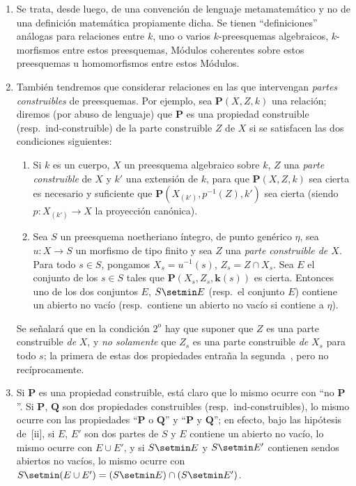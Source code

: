 \begin{remarks}[9.2.2]
\label{IV.9.2.2}
\begin{enumerate}[label=(\roman*)]
  \item Se trata, desde luego, de una convención de lenguaje metamatemático y no de una definición matemática propiamente dicha.
Se tienen ``definiciones'' análogas para relaciones entre $k$, uno o varios $k$-preesquemas algebraicos, $k$-morfismos entre estos preesquemas, Módulos coherentes sobre estos preesquemas u homomorfismos entre estos Módulos.
  \item También tendremos que considerar relaciones en las que intervengan \emph{partes construibles} de preesquemas.
Por ejemplo, sea $\boldsymbol{P}(X,Z,k)$ una relación; diremos (por abuso de lenguaje) que $\boldsymbol{P}$ es una propiedad construible (resp.\ ind-construible) de la parte construible $Z$ de $X$ si se satisfacen las dos condiciones siguientes:
\begin{enumerate}[label=$\arabic*^{\mathrm o}$]
  \item Si $k$ es un cuerpo, $X$ un preesquema algebraico sobre $k$, $Z$ una \emph{parte construible} de $X$ y $k'$ una extensión de $k$, para que $\boldsymbol{P}(X,Z,k)$ sea cierta es necesario y suficiente que $\boldsymbol{P}(X_{(k')},p^{-1}(Z),k')$ sea cierta (siendo $p:X_{(k')}\to X$ la proyección canónica).
  \item Sea $S$ un preesquema noetheriano íntegro, de punto genérico $\eta$, sea $u:X\to S$ un morfismo de tipo finito y sea $Z$ una \emph{parte construible de $X$}.
Para todo $s\in S$, pongamos $X_s=u^{-1}(s)$, $Z_s=Z\cap X_s$.
Sea $E$ el conjunto de los $s\in S$ tales que $\boldsymbol{P}(X_s,Z_s,\boldsymbol{k}(s))$ es cierta.
Entonces uno de los dos conjuntos $E$, $S\setmin E$ (resp.\ el conjunto $E$) contiene un abierto no vacío (resp.\ contiene un abierto no vacío si contiene a $\eta$).
\end{enumerate}

Se señalará que en la condición $2^{\mathrm o}$ hay que suponer que $Z$ es una parte construible \emph{de} $X$, y \emph{no solamente} que $Z_s$ es una parte construible \emph{de} $X_s$ para todo $s$; la primera de estas dos propiedades entraña la segunda~, pero no recíprocamente.

  \item Si $\boldsymbol{P}$ es una propiedad construible, está claro que lo mismo ocurre con ``no $\boldsymbol{P}$''.
Si $\boldsymbol{P}$, $\boldsymbol{Q}$ son dos propiedades construibles (resp.\ ind-construibles), lo mismo ocurre con las propiedades ``$\boldsymbol{P}$ o $\boldsymbol{Q}$'' y ``$\boldsymbol{P}$ y $\boldsymbol{Q}$''; en efecto, bajo las hipótesis de~[ii], si $E$, $E'$ son dos partes de $S$ y $E$ contiene un abierto no vacío, lo mismo ocurre con $E\cup E'$, y si $S\setmin E$ y $S\setmin E'$ contienen sendos abiertos no vacíos, lo mismo ocurre con $S\setmin(E\cup E')=(S\setmin E)\cap(S\setmin E')$.


\end{enumerate}
\end{remarks}
